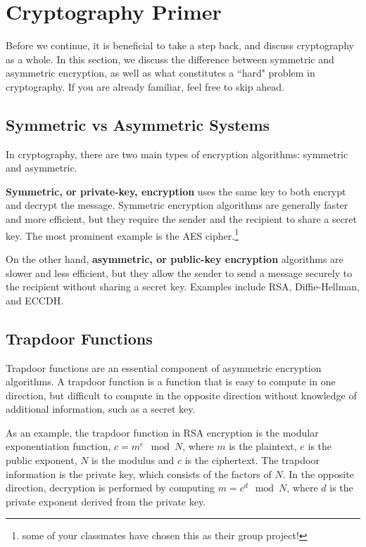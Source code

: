 \documentclass{article}
\begin{document}
\section*{Cryptography Primer}
    Before we continue, it is beneficial to take a step back, and discuss cryptography as a whole. In this section, we discuss the difference between symmetric and asymmetric encryption, as well as what constitutes a ``hard" problem in cryptography. If you are already familiar, feel free to skip ahead.

\subsection*{Symmetric vs Asymmetric Systems}

    In cryptography, there are two main types of encryption algorithms: symmetric and asymmetric. 

    \vspace{3mm}
    \textbf{Symmetric, or private-key, encryption} uses the same key to both encrypt and decrypt the message. Symmetric encryption algorithms are generally faster and more efficient, but they require the sender and the recipient to share a secret key. The most prominent example is the AES cipher.\footnote{some of your classmates have chosen this as their group project!} 

    \vspace{3mm}
    On the other hand, \textbf{asymmetric, or public-key encryption} algorithms are slower and less efficient, but they allow the sender to send a message securely to the recipient without sharing a secret key. Examples include RSA, Diffie-Hellman, and ECCDH.

\subsection*{Trapdoor Functions}
    
    Trapdoor functions are an essential component of asymmetric encryption algorithms. A trapdoor function is a function that is easy to compute in one direction, but difficult to compute in the opposite direction without knowledge of additional information, such as a secret key.
    
    \vspace{2mm}
    As an example, the trapdoor function in RSA encryption is the modular exponentiation function, $c = m^e \mod N$, where $m$ is the plaintext, $e$ is the public exponent, $N$ is the modulus and $c$ is the ciphertext. The trapdoor information is the private key, which consists of the factors of $N$. In the opposite direction, decryption is performed by computing $m = c^d \mod N$, where $d$ is the private exponent derived from the private key.
\end{document}
